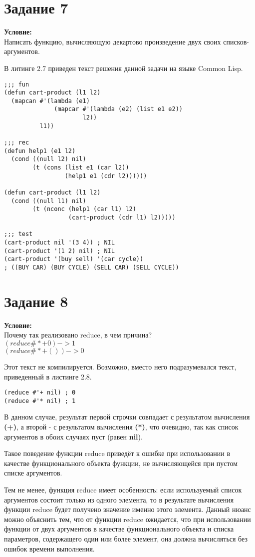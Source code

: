 \section{Задание \No{}7}
\textbf{Условие:}\\Написать функцию, вычисляющую декартово произведение двух своих списков-аргументов.

В литинге 2.7 приведен текст решения данной задачи на языке Common Lisp.

\begin{lstlisting}[caption={Задание \No{}7}]
;;; fun
(defun cart-product (l1 l2)
  (mapcan #'(lambda (e1)
              (mapcar #'(lambda (e2) (list e1 e2))
                      l2))
          l1))

;;; rec
(defun help1 (e1 l2)
  (cond ((null l2) nil)
        (t (cons (list e1 (car l2))
                 (help1 e1 (cdr l2))))))

(defun cart-product (l1 l2)
  (cond ((null l1) nil)
        (t (nconc (help1 (car l1) l2)
                  (cart-product (cdr l1) l2)))))

;;; test
(cart-product nil '(3 4)) ; NIL
(cart-product '(1 2) nil) ; NIL
(cart-product '(buy sell) '(car cycle))
; ((BUY CAR) (BUY CYCLE) (SELL CAR) (SELL CYCLE))
\end{lstlisting}

\section{Задание \No{}8}
\textbf{Условие:}\\Почему так реализовано reduce, в чем причина?\\$(reduce \#*+0) -> 1$\\$(reduce \#*+ ()) -> 0$

Этот текст не компилируется. Возможно, вместо него подразумевался текст, приведенный в листинге 2.8.
\begin{lstlisting}[caption={Задание \No{}8}]
(reduce #'+ nil) ; 0
(reduce #'* nil) ; 1
\end{lstlisting}

В данном случае, результат первой строчки совпадает с результатом вычисления \textbf{(+)}, а второй - с результатом вычисления \textbf{(*)}, что очевидно, так как список аргументов в обоих случаях пуст (равен \textbf{nil}).

Такое поведение функции reduce приведёт к ошибке при использовании в качестве функционального объекта функции, не вычисляющейся при пустом списке аргументов.

Тем не менее, функция reduce имеет особенность: если используемый список аргументов состоит только из одного элемента, то в результате вычисления функции reduce будет получено значение именно этого элемента. Данный нюанс можно объяснить тем, что от функции reduce ожидается, что при использовании функции от двух аргументов в качестве функционального объекта и списка параметров, содержащего один или более элемент, она должна вычисляться без ошибок времени выполнения.

